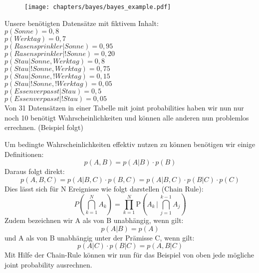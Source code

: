 \begin{figure}[h]
    \centering
    \texttt{[image: chapters/bayes/bayes\_example.pdf]}
\end{figure}

Unsere benötigten Datensätze mit fiktivem Inhalt:\\
$p(Sonne) = 0,8$\\
$p(Werktag)= 0,7$\\
$p(Rasensprinkler | Sonne) = 0,95$\\
$p(Rasensprinkler | !Sonne) = 0,20$\\
$p(Stau | Sonne,Werktag) = 0,8$\\
$p(Stau | !Sonne, Werktag) = 0,75$\\
$p(Stau | Sonne, !Werktag) = 0,15$\\
$p(Stau | !Sonne, !Werktag) = 0,05$\\
$p(Essen verpasst | Stau) = 0,5$\\
$p(Essen verpasst | !Stau) = 0,05$\\

Von 31 Datensätzen in einer Tabelle mit joint probabilities haben wir nun nur noch 10 benötigt Wahrscheinlichkeiten und können alle anderen nun problemlos errechnen. (Beispiel folgt)

Um bedingte Wahrscheinlichkeiten effektiv nutzen zu können benötigen wir einige Definitionen:
\begin{equation*}
p(A,B) = p (A | B) \cdot p (B)
\end{equation*}
Daraus folgt direkt:
\begin{equation*}
p(A,B,C) = p(A | B,C) \cdot p(B,C) = p(A | B,C) \cdot p(B | C) \cdot p(C)
\end{equation*}
Dies lässt sich für N Ereignisse wie folgt darstellen (Chain Rule):
\begin{equation*}
P\left(\bigcap_{k=1}^N A_k\right)  = \prod_{k=1}^N  \mathrm P\left(A_k \,\Bigg|\, \bigcap_{j=1}^{k-1} A_j\right)
\end{equation*}
Zudem bezeichnen wir A als von B unabhängig, wenn gilt:
\begin{equation*}
p(A | B) = p(A)
\end{equation*}
und A als von B unabhängig unter der Prämisse C, wenn gilt:
\begin{equation*}
p(A | C) \cdot p(B | C) = p(A,B | C)
\end{equation*}
%
Mit Hilfe der Chain-Rule können wir nun für das Beispiel von oben jede mögliche joint probability ausrechnen.
%
